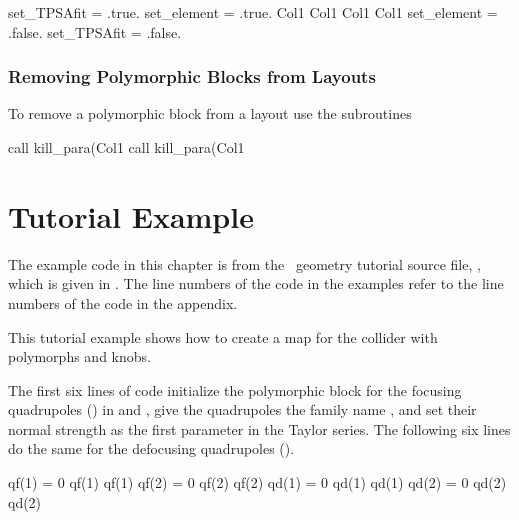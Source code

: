 \begin{ptccode}
set_TPSAfit = .true.
set_element = .true.
Col1%
Col1%
Col1%
Col1%
set_element = .false.
set_TPSAfit = .false.
\end{ptccode}


\subsubsection{Removing Polymorphic Blocks from Layouts}

%
To remove a polymorphic block from a layout use the subroutines
\begin{ptccode}
call kill_para(Col1%
call kill_para(Col1%
\end{ptccode}


\section{Tutorial Example}

%
The example code in this chapter is from the \PTC\ geometry tutorial source file, , which is given in . The line numbers of the code in the examples refer to the line numbers of the code in the appendix.

This tutorial example shows how to create a map for the collider with polymorphs and knobs.

The first six lines of code initialize the polymorphic block for the
focusing quadrupoles () in  and ,
give the quadrupoles the family name , and set
their normal strength as the first parameter in the Taylor series. The following six lines do the same for the defocusing quadrupoles ().

\begin{ptccode}
qf(1) = 0
qf(1)%
qf(1)%
qf(2) = 0
qf(2)%
qf(2)%
qd(1) = 0
qd(1)%
qd(1)%
qd(2) = 0
qd(2)%
qd(2)%
\end{ptccode}

